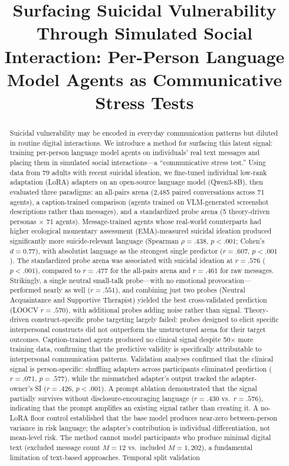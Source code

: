 \documentclass[review,12pt,authoryear]{elsarticle}
\begin{document}
\begin{frontmatter}

\title{Surfacing Suicidal Vulnerability Through Simulated Social Interaction: Per-Person Language Model Agents as Communicative Stress Tests}


\begin{abstract}
Suicidal vulnerability may be encoded in everyday communication patterns but diluted in routine digital interactions. We introduce a method for surfacing this latent signal: training per-person language model agents on individuals' real text messages and placing them in simulated social interactions---a ``communicative stress test.'' Using data from 79 adults with recent suicidal ideation, we fine-tuned individual low-rank adaptation (LoRA) adapters on an open-source language model (Qwen3-8B), then evaluated three paradigms: an all-pairs arena (2,485 paired conversations across 71 agents), a caption-trained comparison (agents trained on VLM-generated screenshot descriptions rather than messages), and a standardized probe arena (5 theory-driven personas $\times$ 71 agents). Message-trained agents whose real-world counterparts had higher ecological momentary assessment (EMA)-measured suicidal ideation produced significantly more suicide-relevant language (Spearman $\rho = .438$, $p < .001$; Cohen's $d = 0.77$), with absolutist language as the strongest single predictor ($r = .607$, $p < .001$). The standardized probe arena was associated with suicidal ideation at $r = .576$ ($p < .001$), compared to $r = .477$ for the all-pairs arena and $r = .461$ for raw messages. Strikingly, a single neutral small-talk probe---with no emotional provocation---performed nearly as well ($r = .551$), and combining just two probes (Neutral Acquaintance and Supportive Therapist) yielded the best cross-validated prediction (LOOCV $r = .570$), with additional probes adding noise rather than signal. Theory-driven construct-specific probe targeting largely failed: probes designed to elicit specific interpersonal constructs did not outperform the unstructured arena for their target outcomes. Caption-trained agents produced no clinical signal despite 50$\times$ more training data, confirming that the predictive validity is specifically attributable to interpersonal communication patterns. Validation analyses confirmed that the clinical signal is person-specific: shuffling adapters across participants eliminated prediction ($r = .071$, $p = .577$), while the mismatched adapter's output tracked the adapter-owner's SI ($r = .426$, $p < .001$). A prompt ablation demonstrated that the signal partially survives without disclosure-encouraging language ($r = .430$ vs.\ $r = .576$), indicating that the prompt amplifies an existing signal rather than creating it. A no-LoRA floor control established that the base model produces near-zero between-person variance in risk language; the adapter's contribution is individual differentiation, not mean-level risk. The method cannot model participants who produce minimal digital text (excluded message count $M = 12$ vs.\ included $M = 1{,}202$), a fundamental limitation of text-based approaches. Temporal split validation 
\end{abstract}
\end{frontmatter}
\end{document}
